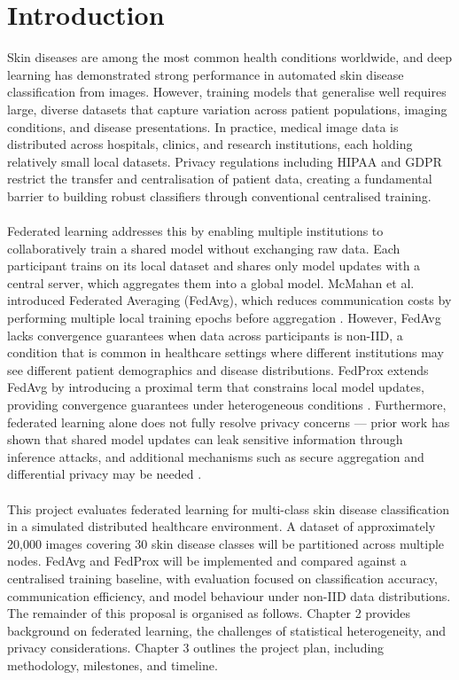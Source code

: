 \documentclass[12pt,openany,a4paper]{book}
\begin{document}
\chapter{Introduction}
  Skin diseases are among the most common health conditions worldwide, and deep learning has demonstrated strong performance in automated skin disease classification from images. However, training models that generalise well requires large, diverse datasets that capture variation across patient populations, imaging conditions, and disease presentations. In practice, medical image data is distributed across hospitals, clinics, and research institutions, each holding relatively small local datasets. Privacy regulations including HIPAA and GDPR restrict the transfer and centralisation of patient data, creating a fundamental barrier to building robust classifiers through conventional centralised training.\\
  \\
  Federated learning addresses this by enabling multiple institutions to collaboratively train a shared model without exchanging raw data. Each participant trains on its local dataset and shares only model updates with a central server, which aggregates them into a global model. McMahan et al. introduced Federated Averaging (FedAvg), which reduces communication costs by performing multiple local training epochs before aggregation \cite{mcmahanCommunicationEfficientLearningDeep2023}. However, FedAvg lacks convergence guarantees when data across participants is non-IID, a condition that is common in healthcare settings where different institutions may see different patient demographics and disease distributions. FedProx extends FedAvg by introducing a proximal term that constrains local model updates, providing convergence guarantees under heterogeneous conditions \cite{liFederatedOptimizationHeterogeneous2020}. Furthermore, federated learning alone does not fully resolve privacy concerns — prior work has shown that shared model updates can leak sensitive information through inference attacks, and additional mechanisms such as secure aggregation and differential privacy may be needed \cite{kaissisSecurePrivacypreservingFederated2020}.\\
  \\
  This project evaluates federated learning for multi-class skin disease classification in a simulated distributed healthcare environment. A dataset of approximately 20,000 images covering 30 skin disease classes will be partitioned across multiple nodes. FedAvg and FedProx will be implemented and compared against a centralised training baseline, with evaluation focused on classification accuracy, communication efficiency, and model behaviour under non-IID data distributions.
  The remainder of this proposal is organised as follows. Chapter 2 provides background on federated learning, the challenges of statistical heterogeneity, and privacy considerations. Chapter 3 outlines the project plan, including methodology, milestones, and timeline.
\end{document}
